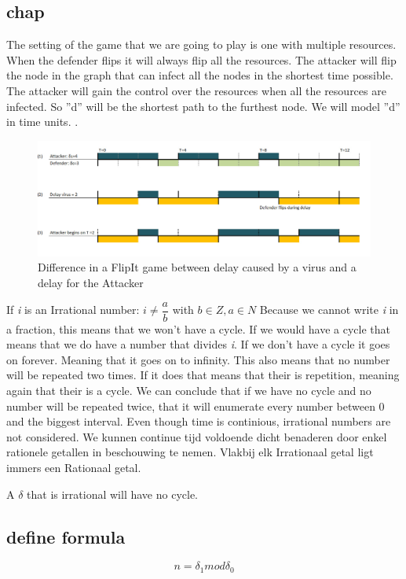 \subsection{chap}
The setting of the game that we are going to play is one with multiple resources. When the defender flips it will always flip all the resources. The attacker will flip the node in the graph that can infect all the nodes in the shortest time possible. The attacker will gain the control over the resources when all the resources are infected. So ''d'' will be the shortest path to the furthest node. We will model ''d'' in time units. .
\begin{figure}[hbtp]
\caption{Difference in a FlipIt game between delay caused by a virus and a delay for the Attacker}
\centering
\includegraphics[scale=0.3]{Images/diffVirusDelay.jpg}
\end{figure}

If \textit{i} is an Irrational number:
$ i \neq \dfrac{a}{b}$ with $b \in Z, a \in N$
Because we cannot write \textit{i} in a fraction, this means that we won't have a cycle. If we would have a cycle that means that we do have a number that divides \textit{i}. If we don't have a cycle it goes on forever. Meaning that it goes on to infinity. This also means that no number will be repeated two times. If it does that means that their is repetition, meaning again that their is a cycle. We can conclude that if we have no cycle and no number will be repeated twice, that it will enumerate every number between 0 and the biggest interval. 
Even though time is continious, irrational numbers are not considered. We kunnen continue tijd voldoende dicht benaderen door enkel rationele getallen in beschouwing te nemen. Vlakbij elk Irrationaal getal ligt immers een Rationaal getal.

A $\delta$ that is irrational will have no cycle. 

\subsection{define formula}
\begin{equation}\label{first}
n = \delta_{1} mod \delta_{0}
\end{equation}

